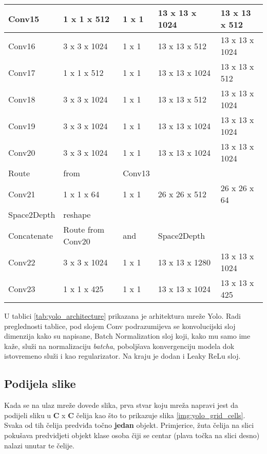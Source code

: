 \begin{minipage}{\linewidth}
\begin{tabular}{||l|l|l|l|l||}
\hline
	Conv15 & 1 x 1 x 512 & 1 x 1 & 13 x  13 x 1024 & 13 x  13 x 512 \\
\hline
	Conv16 & 3 x 3 x 1024 & 1 x 1 & 13 x  13 x 512 & 13 x  13 x 1024 \\
\hline
	Conv17 & 1 x 1 x 512 & 1 x 1 & 13 x  13 x 1024 & 13 x  13 x 512 \\
\hline
	Conv18 & 3 x 3 x 1024 & 1 x 1 & 13 x  13 x 512 & 13 x  13 x 1024 \\
\hline
	Conv19 & 3 x 3 x 1024 & 1 x 1 & 13 x  13 x 1024 & 13 x  13 x 1024 \\
\hline
	Conv20 & 3 x 3 x 1024 & 1 x 1 & 13 x  13 x 1024 & 13 x  13 x 1024 \\
\hline
\hline
	Route & from & Conv13 & & \\
\hline
	Conv21 & 1 x 1 x 64 & 1 x 1 & 26 x  26 x 512 & 26 x  26 x  64 \\
\hline
\hline
	Space2Depth & reshape & & & \\
\hline
	Concatenate & Route from Conv20 & and & Space2Depth & \\
\hline
	Conv22 & 3 x 3 x 1024 & 1 x 1 & 13 x  13 x 1280 & 13 x  13 x 1024 \\
\hline
	Conv23 & 1 x 1 x 425 & 1 x 1 & 13 x  13 x 1024 & 13 x  13 x 425 \\
\hline
\hline
\end{tabular}
 \label{tab:yolo_architecture} 
\end{minipage}

U tablici \ref{tab:yolo_architecture} prikazana je arhitektura mreže Yolo. Radi preglednosti tablice, pod slojem Conv podrazumijeva se konvolucijski sloj dimenzija kako su napisane, Batch Normalization sloj koji, kako mu samo ime kaže, služi na normalizaciju \textit{batcha}, poboljšava konvergenciju modela dok istovremeno služi i kao regularizator. Na kraju je dodan i Leaky ReLu sloj.

\subsection{Podijela slike}
\label{cells-section}

Kada se na ulaz mreže dovede slika, prva stvar koju mreža napravi jest da podijeli sliku u \textbf{C} x \textbf{C} čelija kao što to prikazuje slika \ref{img:yolo_grid_cells}. Svaka od tih čelija predviđa točno \textbf{jedan} objekt. Primjerice, žuta čelija na slici pokušava predvidjeti objekt klase osoba čiji se centar (plava točka na slici desno) nalazi unutar te čelije.

